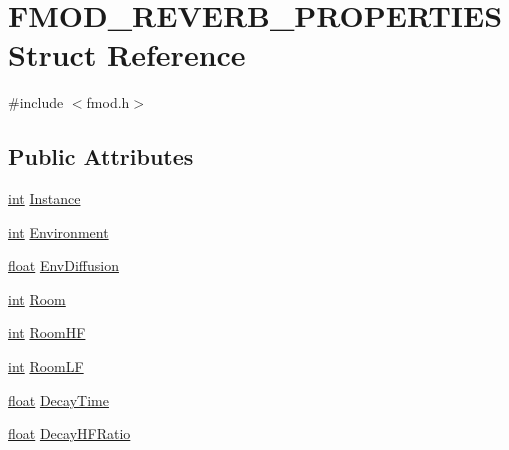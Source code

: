 \hypertarget{struct_f_m_o_d___r_e_v_e_r_b___p_r_o_p_e_r_t_i_e_s}{\section{F\-M\-O\-D\-\_\-\-R\-E\-V\-E\-R\-B\-\_\-\-P\-R\-O\-P\-E\-R\-T\-I\-E\-S Struct Reference}
\label{struct_f_m_o_d___r_e_v_e_r_b___p_r_o_p_e_r_t_i_e_s}
}


{\ttfamily \#include $<$fmod.\-h$>$}

\subsection*{Public Attributes}
\begin{DoxyCompactItemize}
\item 
\hyperlink{wglew_8h_a500a82aecba06f4550f6849b8099ca21}{int} \hyperlink{struct_f_m_o_d___r_e_v_e_r_b___p_r_o_p_e_r_t_i_e_s_a41962641b26cd664ebe99b94a601e415}{Instance}
\item 
\hyperlink{wglew_8h_a500a82aecba06f4550f6849b8099ca21}{int} \hyperlink{struct_f_m_o_d___r_e_v_e_r_b___p_r_o_p_e_r_t_i_e_s_afae3003d52d86bd18cdc1621311f9196}{Environment}
\item 
\hyperlink{fmod_8h_aeb841aa4b4b5f444b5d739d865b420af}{float} \hyperlink{struct_f_m_o_d___r_e_v_e_r_b___p_r_o_p_e_r_t_i_e_s_a694e98175479b3a7ff88b7cfb68f32f0}{Env\-Diffusion}
\item 
\hyperlink{wglew_8h_a500a82aecba06f4550f6849b8099ca21}{int} \hyperlink{struct_f_m_o_d___r_e_v_e_r_b___p_r_o_p_e_r_t_i_e_s_aff2c5393b06ec1238cc8595d9b25d881}{Room}
\item 
\hyperlink{wglew_8h_a500a82aecba06f4550f6849b8099ca21}{int} \hyperlink{struct_f_m_o_d___r_e_v_e_r_b___p_r_o_p_e_r_t_i_e_s_ae4a836dcc26f48773d51c6e40db286a4}{Room\-H\-F}
\item 
\hyperlink{wglew_8h_a500a82aecba06f4550f6849b8099ca21}{int} \hyperlink{struct_f_m_o_d___r_e_v_e_r_b___p_r_o_p_e_r_t_i_e_s_ae07d419ed7e08ea376081b59798f7b1c}{Room\-L\-F}
\item 
\hyperlink{fmod_8h_aeb841aa4b4b5f444b5d739d865b420af}{float} \hyperlink{struct_f_m_o_d___r_e_v_e_r_b___p_r_o_p_e_r_t_i_e_s_a96c2f0bf909c70708440ff25b709fd43}{Decay\-Time}
\item 
\hyperlink{fmod_8h_aeb841aa4b4b5f444b5d739d865b420af}{float} \hyperlink{struct_f_m_o_d___r_e_v_e_r_b___p_r_o_p_e_r_t_i_e_s_afe0c68dd60b6eae25b007a44b9ef3caf}{Decay\-H\-F\-Ratio}

\end{DoxyCompactItemize}
